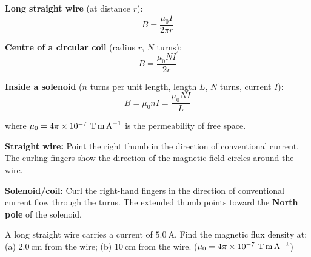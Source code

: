 \begin{diagbox}
\begin{center}
\end{center}
\end{diagbox}

\begin{lawbox}
\textbf{Long straight wire} (at distance $r$):
\[
  B = \frac{\mu_0 I}{2\pi r}
\]

\textbf{Centre of a circular coil} (radius $r$,
$N$ turns):
\[
  B = \frac{\mu_0 NI}{2r}
\]

\textbf{Inside a solenoid} ($n$ turns per unit length,
length $L$, $N$ turns, current $I$):
\[
  B = \mu_0 nI = \frac{\mu_0 NI}{L}
\]

where $\mu_0 = 4\pi\times10^{-7}\ \text{T\,m\,A}^{-1}$
is the permeability of free space.
\end{lawbox}

\begin{processbox}
\textbf{Straight wire:} Point the right thumb in the
direction of conventional current. The curling fingers
show the direction of the magnetic field circles around
the wire.

\textbf{Solenoid/coil:} Curl the right-hand fingers
in the direction of conventional current flow through
the turns. The extended thumb points toward the
\textbf{North pole} of the solenoid.
\end{processbox}

\begin{examplebox}[25.1]
A long straight wire carries a current of $5.0\ \text{A}$.
Find the magnetic flux density at:
(a) $2.0\ \text{cm}$ from the wire;
(b) $10\ \text{cm}$ from the wire.
($\mu_0 = 4\pi\times10^{-7}\ \text{T\,m\,A}^{-1}$)
\end{examplebox}

